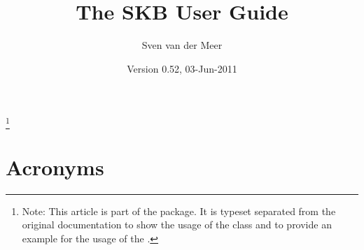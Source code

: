 \documentclass{skbarticle}
\begin{document}
  \title{The SKB User Guide}
  \author{Sven van der Meer}
  \date{Version 0.52, 03-Jun-2011}
  \maketitle

  \begin{abstract}
  \end{abstract}
  \footnote{
      Note: This article is part of the  package. It is typeset separated from 
      the original documentation to show the usage of the \cmd{\skbarticle} class
      and to provide an example for the usage of the .
  }

  \tableofcontents*



  \section*{Acronyms}
    \skbacronyms

  \printbibliography
\end{document}
